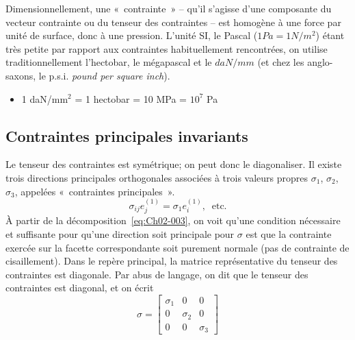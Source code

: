 Dimensionnellement, une «~contrainte~» -- qu'il s'agisse d'une composante du vecteur contrainte ou du tenseur des contraintes -- est homogène à une force par unité de surface, donc à une pression.
L'unité SI, le Pascal ($1 Pa = 1 N/m^2$) étant très petite par rapport aux contraintes habituellement rencontrées, on utilise traditionnellement l'hectobar, le mégapascal et le $daN/mm$ (et chez les anglo-saxons, le p.s.i. \textit{pound per square inch}).
\begin{itemize}
    \item[] 1 daN/mm$^2$ = 1 hectobar = 10 MPa = $10^7$ Pa
\end{itemize}

\subsection{Contraintes principales invariants} \label{ssec:Ch02-1.2}
Le tenseur des contraintes est symétrique; on peut donc le diagonaliser.
Il existe trois directions principales orthogonales associées à trois valeurs propres $\sigma_1$, $\sigma_2$, $\sigma_3$,  appelées «~contraintes principales~».
\begin{equation}
    \sigma_{ij} e_j^{(1)} = \sigma_1 e_i^{(1)},\ \text{ etc.}
    \label{eq:Ch02-008}
\end{equation}
À partir de la décomposition~\eqref{eq:Ch02-003}, on voit qu'une condition nécessaire et suffisante pour qu'une direction soit principale pour $\mathbb{\sigma}$ est que la contrainte exercée sur la facette correspondante soit purement normale (pas de contrainte de cisaillement).
Dans le repère principal, la matrice représentative du tenseur des contraintes est diagonale.
Par abus de langage, on dit que le tenseur des contraintes est diagonal, et on écrit
\begin{equation}
    \mathbb{\sigma} = 
    \begin{bmatrix}
        \sigma_1 & 0 & 0 \\
        0 & \sigma_2 & 0 \\
        0 & 0 & \sigma_3
    \end{bmatrix}
    \label{eq:Ch02-009}
\end{equation}

